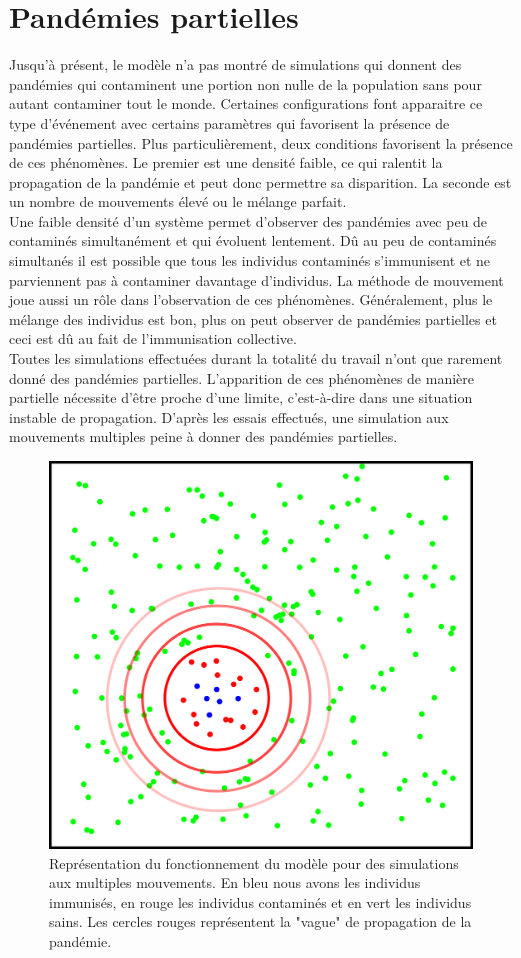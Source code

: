 \section{Pandémies partielles}

Jusqu'à présent, le modèle n'a pas montré de simulations qui donnent des pandémies qui contaminent une portion non nulle de la population sans pour autant contaminer tout le monde. Certaines configurations font apparaitre ce type d'événement avec certains paramètres qui favorisent la présence de pandémies partielles. Plus particulièrement, deux conditions favorisent la présence de ces phénomènes. Le premier est une densité faible, ce qui ralentit la propagation de la pandémie et peut donc permettre sa disparition. La seconde est un nombre de mouvements élevé ou le mélange parfait.\\

Une faible densité d'un système permet d'observer des pandémies avec peu de contaminés simultanément et qui évoluent lentement. Dû au peu de contaminés simultanés il est possible que tous les individus contaminés s'immunisent et ne parviennent pas à contaminer davantage d'individus. La méthode de mouvement joue aussi un rôle dans l'observation de ces phénomènes. Généralement, plus le mélange des individus est bon, plus on peut observer de pandémies partielles et ceci est dû au fait de l'immunisation collective.\\

Toutes les simulations effectuées durant la totalité du travail n’ont que rarement donné des pandémies partielles. L’apparition de ces phénomènes de manière partielle nécessite d’être proche d’une limite, c’est-à-dire dans une situation instable de propagation. D’après les essais effectués, une simulation aux mouvements multiples peine à donner des pandémies partielles. 

\begin{figure}[h]
	\centering
	\captionsetup{justification=centering}
	\includegraphics[width=.5\textwidth]{Images/vague_propagation.png}
	\caption[Vague de propagation]{Représentation du fonctionnement du modèle pour des simulations aux multiples mouvements. En bleu nous avons les individus immunisés, en rouge les individus contaminés et en vert les individus sains. Les cercles rouges représentent la "vague" de propagation de la pandémie.}
\end{figure} 

